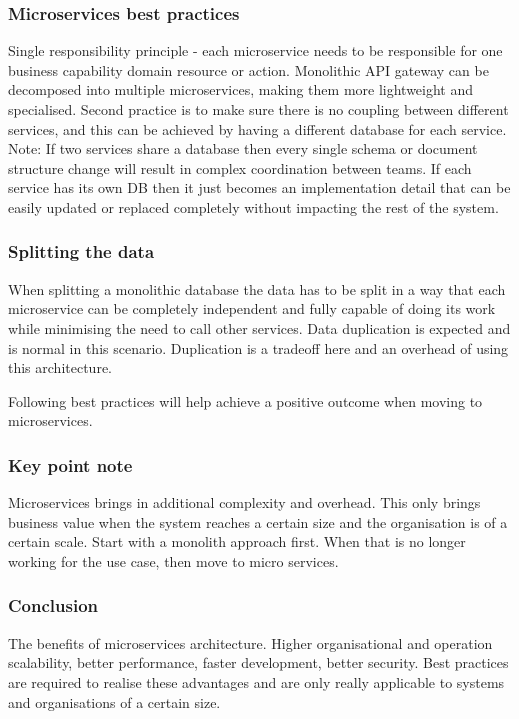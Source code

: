 \subsubsection{Microservices best practices}
Single responsibility principle - each microservice needs to be responsible for one business capability domain resource or action.
Monolithic API gateway can be decomposed into multiple microservices, making them more lightweight and specialised.
Second practice is to make sure there is no coupling between different services, and this can be achieved by having a different database for each service.
Note: If two services share a database then every single schema or document structure change will result in complex coordination between teams.
If each service has its own DB then it just becomes an implementation detail that can be easily updated or replaced completely without impacting the rest of the system.

\subsubsection{Splitting the data}
When splitting a monolithic database the data has to be split in a way that each microservice can be completely independent and fully capable of doing its work while minimising the need to call other services.
Data duplication is expected and is normal in this scenario.
Duplication is a tradeoff here and an overhead of using this architecture.

Following best practices will help achieve a positive outcome when moving to microservices.

\subsubsection{Key point note}
Microservices brings in additional complexity and overhead.
This only brings business value when the system reaches a certain size and the organisation is of a certain scale.
Start with a monolith approach first.
When that is no longer working for the use case, then move to micro services.

\subsubsection{Conclusion}

The benefits of microservices architecture.
Higher organisational and operation scalability, better performance, faster development, better security.
Best practices are required to realise these advantages and are only really applicable to systems and organisations of a certain size.

